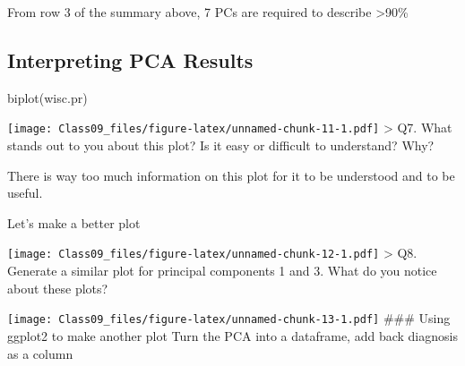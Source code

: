 \documentclass[
]{article}
\newenvironment{Shaded}{\begin{snugshade}}{\end{snugshade}}
\newcommand{\AttributeTok}[1]{\textcolor[rgb]{0.77,0.63,0.00}{#1}}
\newcommand{\DecValTok}[1]{\textcolor[rgb]{0.00,0.00,0.81}{#1}}
\newcommand{\FunctionTok}[1]{\textcolor[rgb]{0.00,0.00,0.00}{#1}}
\newcommand{\NormalTok}[1]{#1}
\newcommand{\SpecialCharTok}[1]{\textcolor[rgb]{0.00,0.00,0.00}{#1}}
\newcommand{\StringTok}[1]{\textcolor[rgb]{0.31,0.60,0.02}{#1}}
\begin{document}
From row 3 of the summary above, 7 PCs are required to describe
\textgreater90\%

\hypertarget{interpreting-pca-results}{%
\subsection{Interpreting PCA Results}\label{interpreting-pca-results}}

\begin{Shaded}
\begin{Highlighting}[]
\FunctionTok{biplot}\NormalTok{(wisc.pr)}
\end{Highlighting}
\end{Shaded}

\texttt{[image: Class09\_files/figure-latex/unnamed-chunk-11-1.pdf]}
\textgreater{} Q7. What stands out to you about this plot? Is it easy or
difficult to understand? Why?

There is way too much information on this plot for it to be understood
and to be useful.

Let's make a better plot

\begin{Shaded}
\end{Shaded}

\texttt{[image: Class09\_files/figure-latex/unnamed-chunk-12-1.pdf]}
\textgreater{} Q8. Generate a similar plot for principal components 1
and 3. What do you notice about these plots?

\begin{Shaded}
\end{Shaded}

\texttt{[image: Class09\_files/figure-latex/unnamed-chunk-13-1.pdf]}
\#\#\# Using ggplot2 to make another plot Turn the PCA into a dataframe,
add back diagnosis as a column
\end{document}
